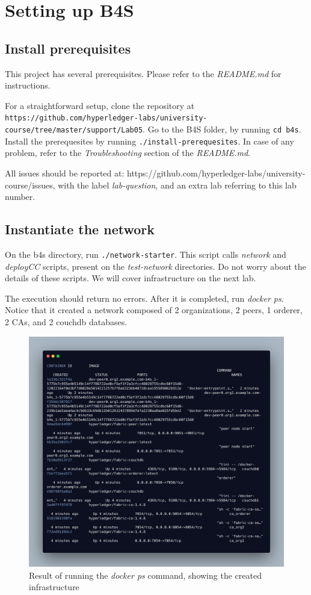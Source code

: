\documentclass[12pt,a4paper]{article}
\theoremstyle{definition}
\begin{document}
\section{Setting up B4S}
\subsection{Install prerequisites}
This project has several prerequisites. Please refer to the \emph{README.md} for instructions. 

For a straightforward setup, clone the repository at \texttt{https://github.com/hyperledger-labs/university-course/tree/master/support/Lab05}. Go to the B4S folder, by running \texttt{cd b4s}. Install the prerequesites by running \texttt{./install-prerequesites}. In case of any problem, refer to the \emph{Troubleshooting} section of the \emph{README.md}. 


All issues should be reported at: https://github.com/hyperledger-labs/university-course/issues, with the label \emph{lab-question}, and an extra lab referring to this lab number. 

\subsection{Instantiate the network}
On the b4s directory, run \texttt{./network-starter}. This script calls \emph{network} and \emph{deployCC} scripts, present on the \emph{test-network} directories. Do not worry about the details of these scripts. We will cover infrastructure on the next lab.

The execution should return no errors. After it is completed, run \emph{docker ps}. Notice that it created a network composed of 2 organizations, 2 peers, 1 orderer, 2 CAs, and 2 couchdb databases.

\begin{figure}[h]
    \centering
    \includegraphics[scale=0.08]{figures/output_docker_ps.png}
    \caption{Result of running the \emph{docker ps} command, showing the created infrastructure}
    \label{fig:docker}
\end{figure}
\end{document}
